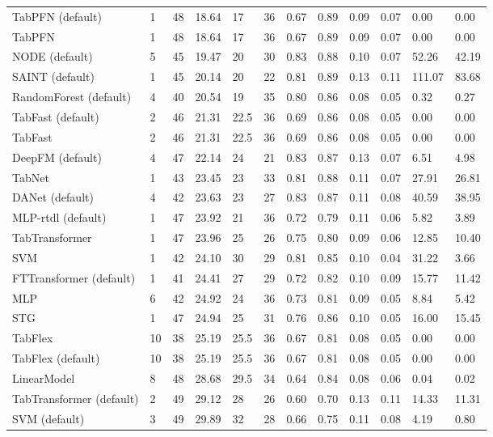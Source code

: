 \begin{tabular}{lllllrllllll}
TabPFN (default) & 1 & 48 & 18.64 & 17 & 36 & 0.67 & 0.89 & 0.09 & 0.07 & 0.00 & 0.00 \\
TabPFN & 1 & 48 & 18.64 & 17 & 36 & 0.67 & 0.89 & 0.09 & 0.07 & 0.00 & 0.00 \\
NODE (default) & 5 & 45 & 19.47 & 20 & 30 & 0.83 & 0.88 & 0.10 & 0.07 & 52.26 & 42.19 \\
SAINT (default) & 1 & 45 & 20.14 & 20 & 22 & 0.81 & 0.89 & 0.13 & 0.11 & 111.07 & 83.68 \\
RandomForest (default) & 4 & 40 & 20.54 & 19 & 35 & 0.80 & 0.86 & 0.08 & 0.05 & 0.32 & 0.27 \\
TabFast (default) & 2 & 46 & 21.31 & 22.5 & 36 & 0.69 & 0.86 & 0.08 & 0.05 & 0.00 & 0.00 \\
TabFast & 2 & 46 & 21.31 & 22.5 & 36 & 0.69 & 0.86 & 0.08 & 0.05 & 0.00 & 0.00 \\
DeepFM (default) & 4 & 47 & 22.14 & 24 & 21 & 0.83 & 0.87 & 0.13 & 0.07 & 6.51 & 4.98 \\
TabNet & 1 & 43 & 23.45 & 23 & 33 & 0.81 & 0.88 & 0.11 & 0.07 & 27.91 & 26.81 \\
DANet (default) & 4 & 42 & 23.63 & 23 & 27 & 0.83 & 0.87 & 0.11 & 0.08 & 40.59 & 38.95 \\
MLP-rtdl (default) & 1 & 47 & 23.92 & 21 & 36 & 0.72 & 0.79 & 0.11 & 0.06 & 5.82 & 3.89 \\
TabTransformer & 1 & 47 & 23.96 & 25 & 26 & 0.75 & 0.80 & 0.09 & 0.06 & 12.85 & 10.40 \\
SVM & 1 & 42 & 24.10 & 30 & 29 & 0.81 & 0.85 & 0.10 & 0.04 & 31.22 & 3.66 \\
FTTransformer (default) & 1 & 41 & 24.41 & 27 & 29 & 0.72 & 0.82 & 0.10 & 0.09 & 15.77 & 11.42 \\
MLP & 6 & 42 & 24.92 & 24 & 36 & 0.73 & 0.81 & 0.09 & 0.05 & 8.84 & 5.42 \\
STG & 1 & 47 & 24.94 & 25 & 31 & 0.76 & 0.86 & 0.10 & 0.05 & 16.00 & 15.45 \\
TabFlex & 10 & 38 & 25.19 & 25.5 & 36 & 0.67 & 0.81 & 0.08 & 0.05 & 0.00 & 0.00 \\
TabFlex (default) & 10 & 38 & 25.19 & 25.5 & 36 & 0.67 & 0.81 & 0.08 & 0.05 & 0.00 & 0.00 \\
LinearModel & 8 & 48 & 28.68 & 29.5 & 34 & 0.64 & 0.84 & 0.08 & 0.06 & 0.04 & 0.02 \\
TabTransformer (default) & 2 & 49 & 29.12 & 28 & 26 & 0.60 & 0.70 & 0.13 & 0.11 & 14.33 & 11.31 \\
SVM (default) & 3 & 49 & 29.89 & 32 & 28 & 0.66 & 0.75 & 0.11 & 0.08 & 4.19 & 0.80 \\

\end{tabular}
